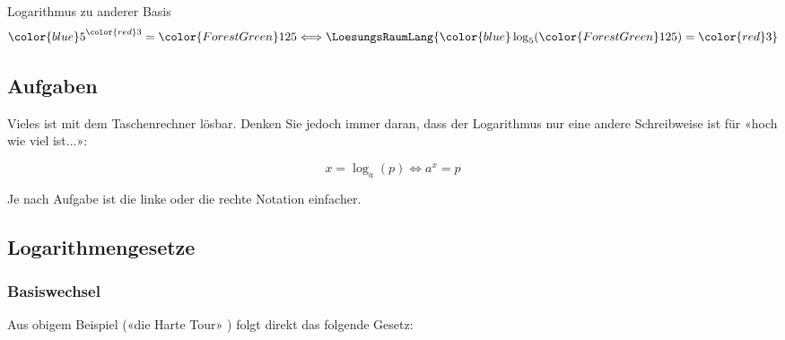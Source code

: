  \begin{beispiel}{Logarithmus zu anderer Basis}{}
$$   {\color{blue}5}^{\color{red}3} = {\color{ForestGreen}125}
   \Longleftrightarrow \LoesungsRaumLang{{\color{blue}\log_5}({\color{ForestGreen}125}) = {\color{red}3}}$$
   \end{beispiel}
 

\subsection*{Aufgaben}

Vieles ist mit dem Taschenrechner lösbar. Denken Sie jedoch immer
daran, dass der Logarithmus nur eine andere Schreibweise ist für «hoch
wie viel ist...»:

$$x=\log_a(p) \Longleftrightarrow  a^x=p$$

Je nach Aufgabe ist die linke oder die rechte Notation einfacher.





\newpage



\subsection{Logarithmengesetze}
\subsubsection{Basiswechsel}
Aus obigem Beispiel («die Harte Tour» ) folgt direkt das folgende Gesetz:

